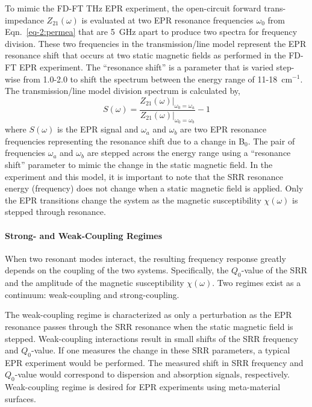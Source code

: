 To mimic the FD-FT THz EPR experiment, the open-circuit forward trans-impedance $Z_{21}(\omega)$ is evaluated at two EPR resonance frequencies $\omega_0$ from Eqn.~\ref{eq-2:permea} that are 5~GHz apart to produce two spectra for frequency division. These two frequencies in the transmission\-/line model represent the EPR resonance shift that occurs at two static magnetic fields as performed in the FD-FT EPR experiment. The ``resonance shift'' is a parameter that is varied step-wise from 1.0-2.0 to shift the spectrum between the energy range of 11-18~cm$^{-1}$. The transmission\-/line model division spectrum is calculated by, 
\begin{equation}
    S(\omega) = \frac{Z_{21}(\omega)\Bigr\rvert_{\omega_0 = \omega_a}}{Z_{21}(\omega)\Bigr\rvert_{\omega_0 = \omega_b}} - 1
\end{equation}
where $S(\omega)$ is the EPR signal and $\omega_a$ and $\omega_b$ are two EPR resonance frequencies representing the resonance shift due to a change in B$_0$. The pair of frequencies $\omega_a$ and $\omega_b$ are stepped across the energy range using a ``resonance shift'' parameter to mimic the change in the static magnetic field. In the experiment and this model, it is important to note that the SRR resonance energy (frequency) does not change when a static magnetic field is applied. Only the EPR transitions change the system as the magnetic susceptibility $\chi(\omega)$ is stepped through resonance.

\noindent \paragraph*{Strong- and Weak-Coupling Regimes}
When two resonant modes interact, the resulting frequency response greatly depends on the coupling of the two systems. Specifically, the $Q_0$-value of the SRR and the amplitude of the magnetic susceptibility $\chi(\omega)$. Two regimes exist as a continuum: weak-coupling and strong-coupling. 

The weak-coupling regime is characterized as only a perturbation as the EPR resonance passes through the SRR resonance when the static magnetic field is stepped. Weak-coupling interactions result in small shifts of the SRR frequency and $Q_0$-value. If one measures the change in these SRR parameters, a typical EPR experiment would be performed. The measured shift in SRR frequency and $Q_0$-value would correspond to dispersion and absorption signals, respectively. \cite{abragam1961, poole} Weak-coupling regime is desired for EPR experiments using meta-material surfaces.

